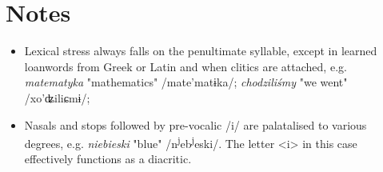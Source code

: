 
\section*{Notes}

\begin{itemize}
    \item Lexical stress always falls on the penultimate syllable, except in learned loanwords from Greek or Latin and when clitics are attached, e.g. \textit{matematyka} "mathematics" /mate'matɨka/; \textit{chodziliśmy} "we went" /xo'ʥiliɕmɨ/; 
    \item Nasals and stops followed by pre-vocalic /i/ are palatalised to various degrees, e.g. \textit{niebieski} "blue" /n\textsuperscript{j}eb\textsuperscript{j}eski/. The letter <i> in this case effectively functions as a diacritic.
\end{itemize}
